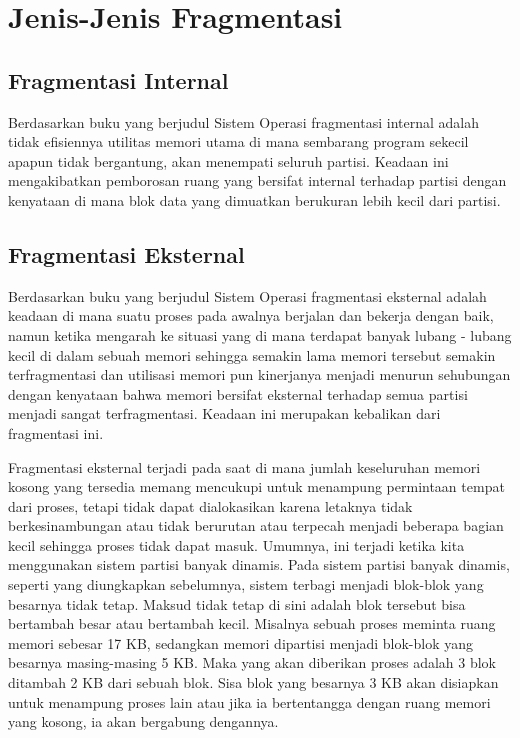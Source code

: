 
\section{Jenis-Jenis Fragmentasi}
\subsection{Fragmentasi Internal}
Berdasarkan buku yang berjudul Sistem Operasi \cite{pangera2005sistem} fragmentasi internal adalah tidak efisiennya utilitas memori utama di mana sembarang program sekecil apapun tidak bergantung, akan menempati seluruh partisi. Keadaan ini mengakibatkan pemborosan ruang yang bersifat internal terhadap partisi dengan kenyataan di mana blok data yang dimuatkan berukuran lebih kecil dari partisi.


\subsection{Fragmentasi Eksternal}
Berdasarkan buku yang berjudul Sistem Operasi \cite{pangera2005sistem} fragmentasi eksternal adalah keadaan di mana suatu proses pada awalnya berjalan dan bekerja dengan baik, namun ketika mengarah ke situasi yang di mana terdapat banyak lubang - lubang kecil di dalam sebuah memori sehingga semakin lama memori tersebut semakin terfragmentasi dan utilisasi memori pun kinerjanya menjadi menurun sehubungan dengan kenyataan bahwa memori bersifat eksternal terhadap semua partisi menjadi sangat terfragmentasi. Keadaan ini merupakan kebalikan dari fragmentasi ini.

Fragmentasi eksternal terjadi pada saat di mana jumlah keseluruhan memori kosong yang tersedia memang mencukupi untuk menampung permintaan tempat dari proses, tetapi tidak dapat dialokasikan karena letaknya tidak berkesinambungan atau tidak berurutan atau terpecah menjadi beberapa bagian kecil sehingga proses tidak dapat masuk. 
Umumnya, ini terjadi ketika kita menggunakan sistem partisi banyak dinamis. Pada sistem partisi banyak dinamis, seperti yang diungkapkan sebelumnya, sistem terbagi menjadi blok-blok yang besarnya tidak tetap.
Maksud tidak tetap di sini adalah blok tersebut bisa bertambah besar atau bertambah kecil. 
Misalnya sebuah proses meminta ruang memori sebesar 17 KB, sedangkan memori dipartisi menjadi blok-blok yang besarnya masing-masing 5 KB. Maka yang akan diberikan proses adalah 3 blok ditambah 2 KB dari sebuah blok. Sisa blok yang besarnya 3 KB akan disiapkan untuk menampung proses lain atau jika ia bertentangga dengan ruang memori yang kosong, ia akan bergabung dengannya.

